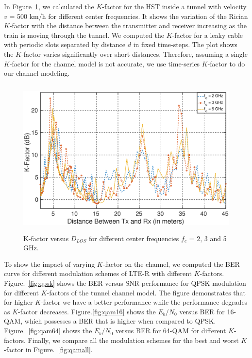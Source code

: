 In Figure~\ref{kfactor}, we calculated the $K$-factor for the HST inside a tunnel with velocity $v$ = 500 km/h for different center frequencies. It shows the variation of the Rician $K$-factor with the distance between the transmitter and receiver increasing as the train is moving through the tunnel. We computed the $K$-factor for a leaky cable with periodic slots separated by distance $d$ in fixed time-steps. The plot shows the $K$-factor varies significantly over short distances. Therefore, assuming a single $K$-factor for the channel model is not accurate, we use time-series $K$-factor to do our channel modeling.

\begin{figure}[!ht]
\centering
\includegraphics[width=\textwidth,keepaspectratio,height=8cm]{images/Gill/lte_figs/kfactordist.eps} 
\caption{K-factor versus $D_{LOS}$ for different center frequencies $f_c$ = 2, 3 and 5 GHz.}
\label{kfactor}
\end{figure}

To show the impact of varying $K$-factor on the channel, we computed the BER curve for different modulation schemes of LTE-R with different $K$-factors. Figure.~\ref{fig:qpsk} shows the BER versus SNR performance for QPSK modulation for different $K$-factors of the tunnel channel model. The figure demonstrates that for higher $K$-factor we have a better performance while the performance degrades as $K$-factor decreases. Figure.\ref{fig:qam16} shows the $E_b/N_0$ versus BER for 16-QAM, which possesses a BER that is higher when compared to QPSK. Figure.~\ref{fig:qam64} shows the $E_b/N_0$ versus BER for 64-QAM for different $K$-factors. Finally, we compare all the modulation schemes for the best and worst $K$-factor in Figure.~\ref{fig:qamall}.

